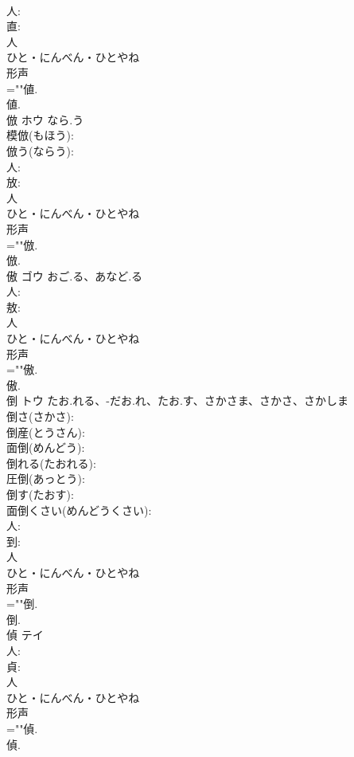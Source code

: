 \documentclass[8pt]{extreport}
\begin{document}
\begin{CJK}{UTF8}{min}
\\	人: 
\\	直: 
\\	人	
\\	ひと・にんべん・ひとやね	
\\	形声 
\\	=""値.
\\	値.
\\	倣	ホウ	なら.う		
\\	模倣(もほう): 
\\	倣う(ならう): 
\\	人: 
\\	放: 
\\	人	
\\	ひと・にんべん・ひとやね	
\\	形声 
\\	=""倣.
\\	倣.
\\	傲	ゴウ	おご.る、あなど.る		
\\	人: 
\\	敖: 
\\	人	
\\	ひと・にんべん・ひとやね	
\\	形声 
\\	=""傲.
\\	傲.
\\	倒	トウ	たお.れる、-だお.れ、たお.す、さかさま、さかさ、さかしま		
\\	倒さ(さかさ): 
\\	倒産(とうさん): 
\\	面倒(めんどう): 
\\	倒れる(たおれる): 
\\	圧倒(あっとう): 
\\	倒す(たおす): 
\\	面倒くさい(めんどうくさい): 
\\	人: 
\\	到: 
\\	人	
\\	ひと・にんべん・ひとやね	
\\	形声 
\\	=""倒.
\\	倒.
\\	偵	テイ			
\\	人: 
\\	貞: 
\\	人	
\\	ひと・にんべん・ひとやね	
\\	形声 
\\	=""偵.
\\	偵.

\end{CJK}
\end{document}

